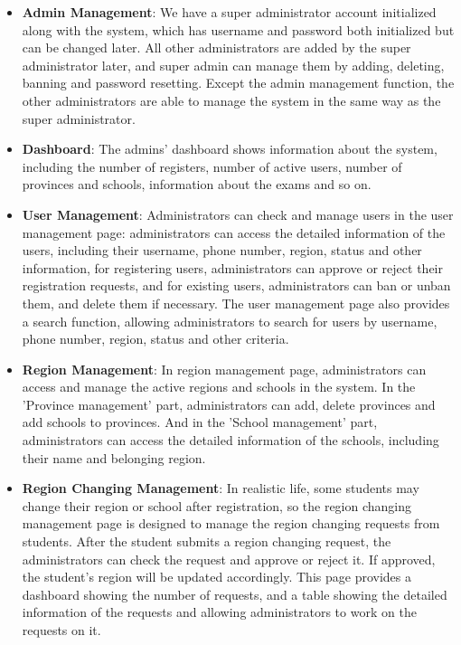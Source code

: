 \documentclass[12pt]{article}
\begin{document}
\begin{itemize}
    \item \textbf{Admin Management}: We have a super administrator account initialized along with the system, which has username and password both initialized but can be changed later. All other administrators are added by the super administrator later, and super admin can manage them by adding, deleting, banning and password resetting. Except the admin management function, the other administrators are able to manage the system in the same way as the super administrator.
    
    \item \textbf{Dashboard}: The admins' dashboard shows information about the system, including the number of registers, number of active users, number of provinces and schools, information about the exams and so on.
    
    \item \textbf{User Management}: Administrators can check and manage users in the user management page: administrators can access the detailed information of the users, including their username, phone number, region, status and other information, for registering users, administrators can approve or reject their registration requests, and for existing users, administrators can ban or unban them, and delete them if necessary. The user management page also provides a search function, allowing administrators to search for users by username, phone number, region, status and other criteria.
    
    \item \textbf{Region Management}: In region management page, administrators can access and manage the active regions and schools in the system. In the 'Province management' part, administrators can add, delete provinces and add schools to provinces. And in the 'School management' part, administrators can access the detailed information of the schools, including their name and belonging region.
    
    \item \textbf{Region Changing Management}: In realistic life, some students may change their region or school after registration, so the region changing management page is designed to manage the region changing requests from students. After the student submits a region changing request, the administrators can check the request and approve or reject it. If approved, the student's region will be updated accordingly. This page provides a dashboard showing the number of requests, and a table showing the detailed information of the requests and allowing administrators to work on the requests on it.
    

\end{itemize}
\end{document}
